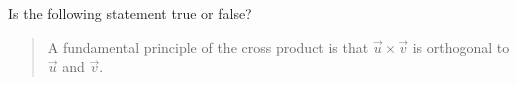 \documentclass{ximera}
\author{Gregory Hartman \and Matthew Carr}
\begin{document}
\begin{exercise}




Is the following statement true or false?

\begin{quote}
A fundamental principle of the cross product is that $\vec{u}\times\vec{v}$ is orthogonal to $\vec{u}$ and $\vec{v}$.
\end{quote}

\begin{multipleChoice}
\end{multipleChoice}

\end{exercise}
\end{document}
